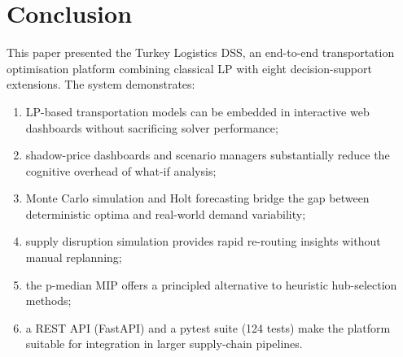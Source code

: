 \documentclass[conference]{IEEEtran}
\begin{document}
\section{Conclusion}
\label{sec:conclusion}

This paper presented the Turkey Logistics DSS, an end-to-end transportation
optimisation platform combining classical LP with eight decision-support
extensions.
The system demonstrates:
\begin{enumerate}
  \item LP-based transportation models can be embedded in interactive
        web dashboards without sacrificing solver performance;
  \item shadow-price dashboards and scenario managers substantially
        reduce the cognitive overhead of what-if analysis;
  \item Monte Carlo simulation and Holt forecasting bridge the gap
        between deterministic optima and real-world demand variability;
  \item supply disruption simulation provides rapid re-routing insights
        without manual replanning;
  \item the p-median MIP offers a principled alternative to heuristic
        hub-selection methods;
  \item a REST API (FastAPI) and a pytest suite (124 tests) make the
        platform suitable for integration in larger supply-chain pipelines.
\end{enumerate}
\end{document}
